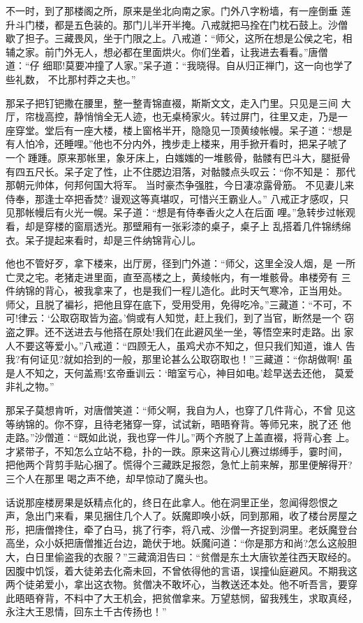 不一时，到了那楼阁之所，原来是坐北向南之家。门外八字粉墙，有一座倒垂
莲升斗门楼，都是五色装的。那门儿半开半掩。八戒就把马拴在门枕石鼓上。沙僧
歇了担子。三藏畏风，坐于门限之上。八戒道：“师父，这所在想是公侯之宅，相
辅之家。前门外无人，想必都在里面烘火。你们坐着，让我进去看看。”唐僧道：“仔
细耶!莫要冲撞了人家。”呆子道：“我晓得。自从归正禅门，这一向也学了些礼数，
不比那村莽之夫也。”

那呆子把钉钯撒在腰里，整一整青锦直裰，斯斯文文，走入门里。只见是三间
大厅，帘栊高控，静悄悄全无人迹，也无桌椅家火。转过屏门，往里又走，乃是一
座穿堂。堂后有一座大楼，楼上窗格半开，隐隐见一顶黄绫帐幔。呆子道：“想是
有人怕冷，还睡哩。”他也不分内外，拽步走上楼来，用手掀开看时，把呆子唬了
一个踵踵。原来那帐里，象牙床上，白媸媸的一堆骸骨，骷髅有巴斗大，腿挺骨
有四五尺长。呆子定了性，止不住腮边泪落，对骷髅点头叹云：“你不知是：
那代那朝元帅体，何邦何国大将军。
当时豪杰争强胜，今日凄凉露骨筋。
不见妻儿来侍奉，那逢士卒把香焚?
谩观这等真堪叹，可惜兴王霸业人。”
八戒正才感叹，只见那帐幔后有火光一幌。呆子道：“想是有侍奉香火之人在后面
哩。”急转步过帐观看，却是穿楼的窗扇透光。那壁厢有一张彩漆的桌子，桌子上
乱搭着几件锦绣绵衣。呆子提起来看时，却是三件纳锦背心儿。

他也不管好歹，拿下楼来，出厅房，径到门外道：“师父，这里全没人烟，是
一所亡灵之宅。老猪走进里面，直至高楼之上，黄绫帐内，有一堆骸骨。串楼旁有
三件纳锦的背心，被我拿来了，也是我们一程儿造化。此时天气寒冷，正当用处。
师父，且脱了褊衫，把他且穿在底下，受用受用，免得吃冷。”三藏道：“不可，不
可!律云：‘公取窃取皆为盗。’倘或有人知觉，赶上我们，到了当官，断然是一个
窃盗之罪。还不送进去与他搭在原处!我们在此避风坐一坐，等悟空来时走路。出
家人不要这等爱小。”八戒道：“四顾无人，虽鸡犬亦不知之，但只我们知道，谁人
告我?有何证见?就如拾到的一般，那里论甚么公取窃取也！”三藏道：“你胡做啊!
虽是人不知之，天何盖焉!玄帝垂训云：‘暗室亏心，神目如电。’趁早送去还他，
莫爱非礼之物。”

那呆子莫想肯听，对唐僧笑道：“师父啊，我自为人，也穿了几件背心，不曾
见这等纳锦的。你不穿，且待老猪穿一穿，试试新，晤晤脊背。等师兄来，脱了还
他走路。”沙僧道：“既如此说，我也穿一件儿。”两个齐脱了上盖直裰，将背心套
上。才紧带子，不知怎么立站不稳，扑的一跌。原来这背心儿赛过绑缚手，霎时间，
把他两个背剪手贴心捆了。慌得个三藏跌足报怨，急忙上前来解，那里便解得开?
三个人在那里喝之声不绝，却早惊动了魔头也。

话说那座楼房果是妖精点化的，终日在此拿人。他在洞里正坐，忽闻得怨恨之
声，急出门来看，果见捆住几个人了。妖魔即唤小妖，同到那厢，收了楼台房屋之
形，把唐僧搀住，牵了白马，挑了行李，将八戒、沙僧一齐捉到洞里。老妖魔登台
高坐，众小妖把唐僧推近台边，跪伏于地。妖魔问道：“你是那方和尚?怎么这般胆
大，白日里偷盗我的衣服？”三藏滴泪告曰：“贫僧是东土大唐钦差往西天取经的。
因腹中饥馁，着大徒弟去化斋未回，不曾依得他的言语，误撞仙庭避风。不期我这
两个徒弟爱小，拿出这衣物。贫僧决不敢坏心，当教送还本处。他不听吾言，要穿
此晤晤脊背，不料中了大王机会，把贫僧拿来。万望慈悯，留我残生，求取真经，
永注大王恩情，回东土千古传扬也！”

